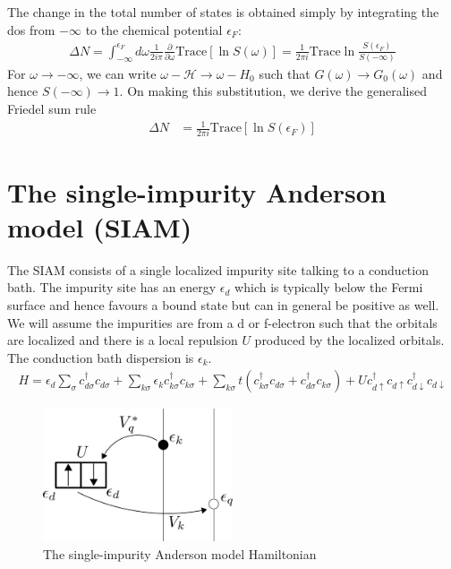 The change in the total number of states is obtained simply by integrating the dos from \(-\infty\) to the chemical potential \(\epsilon_F\):
\begin{equation}\begin{aligned}
	\Delta N = \int_{-\infty}^{\epsilon_F}d\omega\frac{1}{2i\pi}\frac{\partial{}}{\partial{\omega}} \text{Trace}\left[\ln S(\omega)\right] = \frac{1}{2\pi i}\text{Trace} \ln \frac{S(\epsilon_F)}{S(-\infty)}
\end{aligned}\end{equation}
For \(\omega \to -\infty\), we can write \(\omega - \mathcal{H} \to \omega - H_0\) such that \(G(\omega) \to G_0(\omega)\) and hence \(S(-\infty) \to 1\). On making this substitution, we derive the generalised Friedel sum rule \cite{langer}
\begin{equation}\begin{aligned}
	\Delta N &= \frac{1}{2\pi i}\text{Trace} \left[\ln S(\epsilon_F)\right]
\end{aligned}\end{equation}

\section{The single-impurity Anderson model (SIAM)}
The SIAM consists of a single localized impurity site talking to a conduction bath. The impurity site has an energy \(\epsilon_d\) which is typically below the Fermi surface and hence favours a bound state but can in general be positive as well. We will assume the impurities are from a d or f-electron such that the orbitals are localized and there is a local repulsion \(U\) produced by the localized orbitals. The conduction bath dispersion is \(\epsilon_k\).
\begin{equation}\begin{aligned}
	\label{model}
	H = \epsilon_d \sum_\sigma c^\dagger_{d\sigma}c_{d\sigma} + \sum_{k\sigma} \epsilon_k c^\dagger_{k\sigma}c_{k\sigma} + \sum_{k\sigma}t\left(c^\dagger_{k\sigma}c_{d\sigma}+c^\dagger_{d\sigma}c_{k\sigma}\right) + Uc^\dagger_{d\uparrow}c_{d\uparrow}c^\dagger_{d\downarrow}c_{d\downarrow}
\end{aligned}\end{equation}
\begin{figure}[!htpb]
	\centering
	\includegraphics[width=0.5\textwidth]{../figures/model_scheme.png}
	\caption{The single-impurity Anderson model Hamiltonian}
\end{figure}

